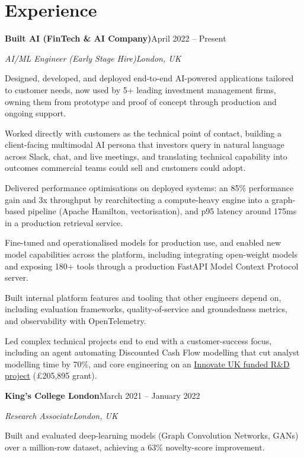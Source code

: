 \documentclass[10pt,a4paper]{article}
\newcommand{\entry}[4]{%
  {\color{company}\bfseries #1}\hfill {\color{muted}#2}\par
  \vspace{1pt}
  {\itshape #3}\hfill {\color{muted}\itshape #4}\par
  \vspace{3pt}%
}
\begin{document}
\section{Experience}
\entry{Built AI (FinTech \& AI Company)}{April 2022 -- Present}{AI/ML Engineer (Early Stage Hire)}{London, UK}
\begin{tight}
  \item Designed, developed, and deployed end-to-end AI-powered applications tailored to customer needs, now used by 5+ leading investment management firms, owning them from prototype and proof of concept through production and ongoing support.
  \item Worked directly with customers as the technical point of contact, building a client-facing multimodal AI persona that investors query in natural language across Slack, chat, and live meetings, and translating technical capability into outcomes commercial teams could sell and customers could adopt.
  \item Delivered performance optimisations on deployed systems: an 85\% performance gain and 3x throughput by rearchitecting a compute-heavy engine into a graph-based pipeline (Apache Hamilton, vectorisation), and p95 latency around 175ms in a production retrieval service.
  \item Fine-tuned and operationalised models for production use, and enabled new model capabilities across the platform, including integrating open-weight models and exposing 180+ tools through a production FastAPI Model Context Protocol server.
  \item Built internal platform features and tooling that other engineers depend on, including evaluation frameworks, quality-of-service and groundedness metrics, and observability with OpenTelemetry.
  \item Led complex technical projects end to end with a customer-success focus, including an agent automating Discounted Cash Flow modelling that cut analyst modelling time by 70\%, and core engineering on an \href{https://gtr.ukri.org/projects?ref=10022996}{Innovate UK funded R\&D project} (\pounds205,895 grant).
\end{tight}

\entry{King's College London}{March 2021 -- January 2022}{Research Associate}{London, UK}
\begin{tight}
  \item Built and evaluated deep-learning models (Graph Convolution Networks, GANs) over a million-row dataset, achieving a 63\% novelty-score improvement.
\end{tight}
\end{document}

